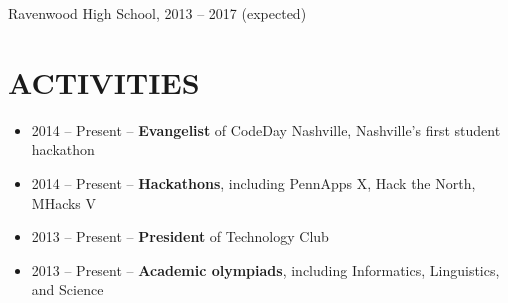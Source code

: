 \documentclass{res}
\begin{document}
Ravenwood High School, 2013 -- 2017 {(expected)}

\section{ACTIVITIES}

\begin{itemize}
  \item 2014 -- Present -- \textbf{Evangelist} of CodeDay Nashville, Nashville's first student hackathon
  \item 2014 -- Present -- \textbf{Hackathons}, including PennApps X, Hack the North, MHacks V
  \item 2013 -- Present -- \textbf{President} of Technology Club
  \item 2013 -- Present -- \textbf{Academic olympiads}, including Informatics, Linguistics, and Science
\end{itemize}
\end{document}
